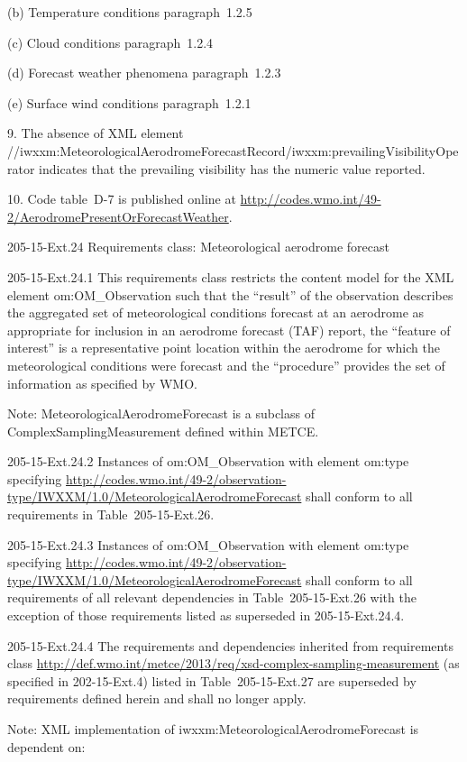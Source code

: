 (b) Temperature conditions paragraph~1.2.5

(c) Cloud conditions paragraph~1.2.4

(d) Forecast weather phenomena paragraph~1.2.3

(e) Surface wind conditions paragraph~1.2.1

9. The absence of XML element //iwxxm:MeteorologicalAerodromeForecastRecord/iwxxm:prevailingVisibilityOperator indicates that the prevailing visibility has the numeric value reported.

10. Code table~D-7 is published online at \url{http://codes.wmo.int/49-2/AerodromePresentOrForecastWeather}.

205-15-Ext.24 Requirements class: Meteorological aerodrome forecast

205-15-Ext.24.1 This requirements class restricts the content model for the XML element om:OM\_Observation such that the ``result'' of the observation describes the aggregated set of meteorological conditions forecast at an aerodrome as appropriate for inclusion in an aerodrome forecast (TAF) report, the ``feature of interest'' is a representative point location within the aerodrome for which the meteorological conditions were forecast and the ``procedure'' provides the set of information as specified by WMO.

Note: MeteorologicalAerodromeForecast is a subclass of ComplexSamplingMeasurement defined within METCE.

205-15-Ext.24.2 Instances of om:OM\_Observation with element om:type specifying \url{http://codes.wmo.int/49-2/observation-type/IWXXM/1.0/MeteorologicalAerodromeForecast} shall conform to all requirements in Table~205-15-Ext.26.

205-15-Ext.24.3 Instances of om:OM\_Observation with element om:type specifying \url{http://codes.wmo.int/49-2/observation-type/IWXXM/1.0/MeteorologicalAerodromeForecast} shall conform to all requirements of all relevant dependencies in Table~205-15-Ext.26 with the exception of those requirements listed as superseded in 205-15-Ext.24.4.

205-15-Ext.24.4 The requirements and dependencies inherited from requirements class \url{http://def.wmo.int/metce/2013/req/xsd-complex-sampling-measurement} (as specified in 202-15-Ext.4) listed in Table~205-15-Ext.27 are superseded by requirements defined herein and shall no longer apply.

Note: XML implementation of iwxxm:MeteorologicalAerodromeForecast is dependent on:

